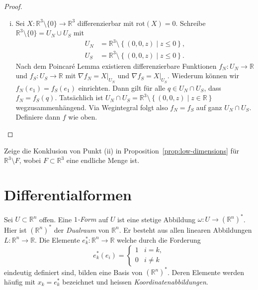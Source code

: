 \documentclass[../main.tex]{subfiles}
\begin{document}
\begin{proof}
\begin{enumerate}[(i)]
    \item Sei
      $X \colon \mathbb{R}^3 \setminus \{0\}
      \to \mathbb{R}^3$ 
      differenzierbar mit $\text{rot}(X) = 0$.
      Schreibe
      $\mathbb{R}^3 \setminus \{0\}
      = U_N \cup U_S$ 
      mit
      \begin{align*}
        U_N & = \mathbb{R}^3 \setminus
        \left\{(0, 0, z) \mid z \leq 0\right\},\\
        U_S & = \mathbb{R}^3 \setminus
        \left\{(0, 0, z) \mid z \leq 0\right\}.
      \end{align*}
      Nach dem Poincaré Lemma existieren differenzierbare Funktionen
      $f_N \colon U_N \to \mathbb{R}$ 
      und $f_S \colon U_S \to \mathbb{R}$ mit
      $\nabla f_N = X|_{U_N}$ und $\nabla f_S = X|_{U_S}$.
      Wiederum können wir
      $f_N(e_1) = f_S(e_1)$ einrichten.
      Dann gilt für alle
      $q \in U_N \cap U_S$, dass
      $f_N = f_S(q)$.
      Tatsächlich ist $U_N \cap U_S = \mathbb{R}^3
      \setminus \left\{(0, 0, z) \mid z \in \mathbb{R}\right\}$ 
      wegzusammenhängend.
      Via Wegintegral folgt also $f_N = f_S$ auf ganz $U_N \cap U_S$.
      Definiere dann $f$ wie oben. \qedhere
  \end{enumerate}
\end{proof}

\begin{exercise}
  Zeige die Konklusion von Punkt (ii) in Proposition~\ref{prop:low-dimensions}
  für $\mathbb{R}^3 \setminus F$, wobei $F \subset \mathbb{R}^3$ 
  eine endliche Menge ist.
\end{exercise}

\section{Differentialformen}
Sei $U \subset \mathbb{R}^n$ offen.
Eine \emph{$1$-Form} auf $U$ ist eine stetige Abbildung
$\omega \colon U \to {(\mathbb{R}^n)}^*$.
Hier ist ${(\mathbb{R}^n)}^*$ der \emph{Dualraum} von $\mathbb{R}^n$.
Er besteht aus allen linearen Abbildungen 
$L \colon \mathbb{R}^n \to \mathbb{R}$.
Die Elemente $e_k^* \colon \mathbb{R}^n \to \mathbb{R}$ 
welche durch die Forderung
\[
  e_k^*(e_i) =
  \begin{cases}
    1 & i = k, \\
    0 & i \neq k
  \end{cases}
\]
eindeutig definiert sind, bilden eine Basis von
${(\mathbb{R}^n)}^*$.
Deren Elemente werden häufig mit $x_k = e_k^*$ 
bezeichnet und heissen \emph{Koordinatenabbildungen}.
\end{document}
